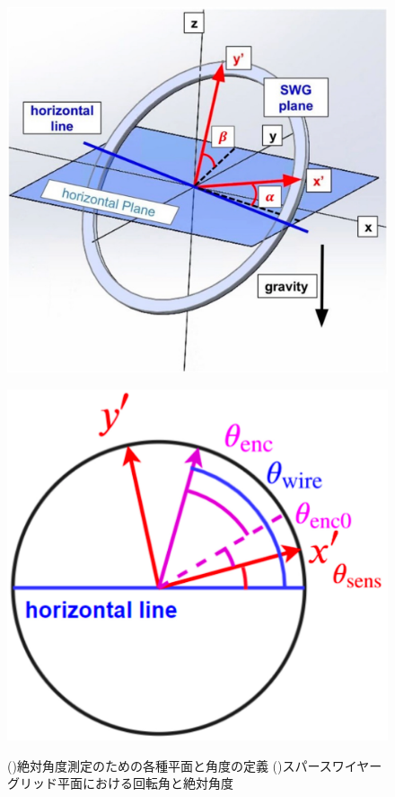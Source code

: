 \documentclass[../../main.tex]{subfiles}
\begin{document}
\begin{figure}[tbp]
    \begin{minipage}[b]{0.48\columnwidth}
        \centering
        \includegraphics[width=\columnwidth]{wiregrid/abs_angle_overview.pdf}
        \subcaption{}
        \label{fig:abs_angle_overview}
    \end{minipage}
    \hspace{0.06\columnwidth}
    \begin{minipage}[b]{0.40\columnwidth}
        \centering
        \includegraphics[width=\columnwidth]{wiregrid/abs_angle_WG_plane.pdf}
        \subcaption{}
        \label{fig:abs_angle_WG_plane}
    \end{minipage}
    \caption{()絶対角度測定のための各種平面と角度の定義 ()スパースワイヤーグリッド平面における回転角と絶対角度}
    \label{fig:abs_angle}
\end{figure}
\end{document}
